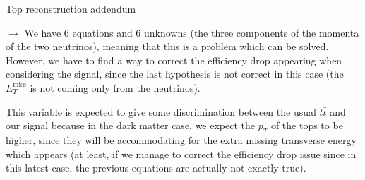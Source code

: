 \documentclass[handout,8 pt]{beamer}
\begin{document}
\begin{frame}{Top reconstruction addendum}
	\vspace{13pt}

	\justifying
	$\rightarrow$ We have 6 equations and 6 unknowns (the three components of the momenta of the two neutrinos), meaning that this is a problem which can be solved. However, we have to find a way to correct the efficiency drop appearing when considering the signal, since the last hypothesis is not correct in this case (the $E_T^{\text{miss}}$ is not coming only from the neutrinos). \vfill
	
	\begin{block}{}
   	\justifying
	\vspace{5pt}
	This variable is expected to give some discrimination between the usual $t \bar t$ and our signal because in the dark matter case, we expect the $p_T$ of the tops to be higher, since they will be accommodating for the extra missing transverse energy which appears (at least, if we manage to correct the efficiency drop issue since in this latest case, the previous equations are actually not exactly true). \vspace{5pt}
	\end{block} \vfill

\end{frame}
\end{document}
